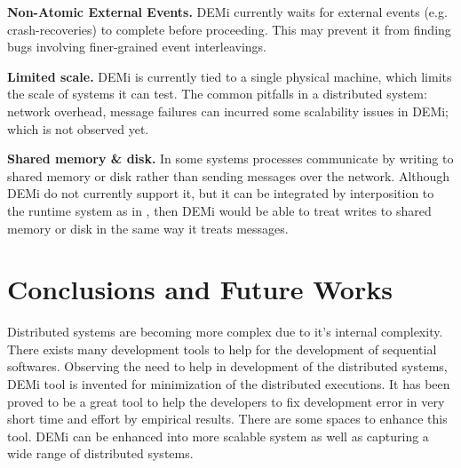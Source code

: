 \textbf{Non-Atomic External Events.} DEMi currently waits for external events (e.g. crash-recoveries) to complete before proceeding. This may prevent it from finding bugs involving finer-grained event interleavings.

\textbf{Limited scale.} DEMi is currently tied to a single physical machine, which limits the scale of systems it can test. The common pitfalls in a distributed system: network overhead, message failures can incurred some scalability issues in DEMi; which is not observed yet.

\textbf{Shared memory \& disk.} In some systems processes communicate by writing to shared memory or disk rather
than sending messages over the network. Although DEMi do not currently support it, but it can be integrated by interposition to the runtime system as in \cite{10}, then DEMi would be able to treat writes to shared memory or disk in the same way it treats messages.

\section{Conclusions and Future Works}
Distributed systems are becoming more complex due to it's internal complexity. There exists many development tools to help for the development of sequential softwares. Observing the need to help in development of the distributed systems, DEMi tool is invented for minimization of the distributed executions. It has been proved to be a great tool to help the developers to fix development error in very short time and effort by empirical results. There are some spaces to enhance this tool. DEMi can be enhanced into more scalable system as well as capturing a wide range of distributed systems.








